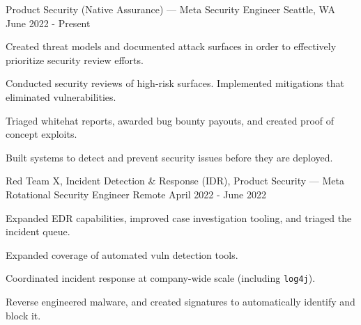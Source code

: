 
\begin{cventries}

\cventry
{Product Security (Native Assurance) — Meta} %
{Security Engineer} %
{Seattle, WA} %
{June 2022 - Present} %
{
	\begin{cvitems} %
		\item {Created threat models and documented attack surfaces in order to effectively prioritize security review efforts.}
		\item {Conducted security reviews of high-risk surfaces. Implemented mitigations that eliminated vulnerabilities.}
		\item {Triaged whitehat reports,  awarded bug bounty payouts, and created proof of concept exploits.}
		\item {Built systems to detect and prevent security issues before they are deployed.}
	\end{cvitems}
}
\cventry
{Red Team X, Incident Detection \& Response (IDR), Product Security —  Meta} %
{Rotational Security Engineer} %
{Remote} %
{April 2022 - June 2022} %
{
	\begin{cvitems} %
		\item {Expanded EDR capabilities, improved case investigation tooling, and triaged the incident queue.}
		\item {Expanded coverage of automated vuln detection tools.}
		\item {Coordinated incident response at company-wide scale (including \texttt{log4j}).}
		\item {Reverse engineered malware, and created signatures to automatically identify and block it.}
	\end{cvitems}
}

\end{cventries}
